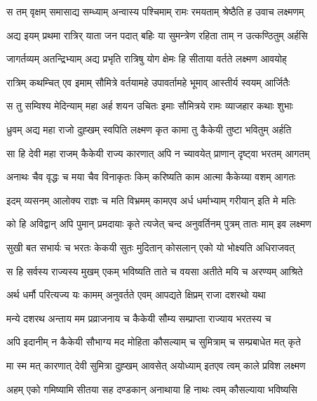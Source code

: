 
\twolineshloka
{स तम् वृक्षम् समासाद्य सम्ध्याम् अन्वास्य पश्चिमाम्}
{रामः रमयताम् श्रेष्ठैति ह उवाच लक्ष्मणम्} %

\twolineshloka
{अद्य इयम् प्रथमा रात्रिर् याता जन पदात् बहिः}
{या सुमन्त्रेण रहिता ताम् न उत्कण्ठितुम् अर्हसि} %

\twolineshloka
{जागर्तव्यम् अतन्द्रिभ्याम् अद्य प्रभृति रात्रिषु}
{योग क्षेमः हि सीताया वर्तते लक्ष्मण आवयोह्} %

\twolineshloka
{रात्रिम् कथम्चित् एव इमाम् सौमित्रे वर्तयामहे}
{उपावर्तामहे भूमाव् आस्तीर्य स्वयम् आर्जितैः} %

\twolineshloka
{स तु सम्विश्य मेदिन्याम् महा अर्ह शयन उचितः}
{इमाः सौमित्रये रामः व्याजहार कथाः शुभाः} %

\twolineshloka
{ध्रुवम् अद्य महा राजो दुह्खम् स्वपिति लक्ष्मण}
{कृत कामा तु कैकेयी तुष्टा भवितुम् अर्हति} %

\twolineshloka
{सा हि देवी महा राजम् कैकेयी राज्य कारणात्}
{अपि न च्यावयेत् प्राणान् दृष्ट्वा भरतम् आगतम्} %

\twolineshloka
{अनाथः चैव वृद्धः च मया चैव विनाकृतः}
{किम् करिष्यति काम आत्मा कैकेय्या वशम् आगतः} %

\twolineshloka
{इदम् व्यसनम् आलोक्य राज्ञः च मति विभ्रमम्}
{कामएव अर्ध धर्माभ्याम् गरीयान् इति मे मतिः} %

\twolineshloka
{को हि अविद्वान् अपि पुमान् प्रमदायाः कृते त्यजेत्}
{चन्द अनुवर्तिनम् पुत्रम् तातः माम् इव लक्ष्मण} %

\twolineshloka
{सुखी बत सभार्यः च भरतः केकयी सुतः}
{मुदितान् कोसलान् एको यो भोक्ष्यति अधिराजवत्} %

\twolineshloka
{स हि सर्वस्य राज्यस्य मुखम् एकम् भविष्यति}
{ताते च वयसा अतीते मयि च अरण्यम् आश्रिते} %

\twolineshloka
{अर्थ धर्मौ परित्यज्य यः कामम् अनुवर्तते}
{एवम् आपद्यते क्षिप्रम् राजा दशरथो यथा} %

\twolineshloka
{मन्ये दशरथ अन्ताय मम प्रव्राजनाय च}
{कैकेयी सौम्य सम्प्राप्ता राज्याय भरतस्य च} %

\twolineshloka
{अपि इदानीम् न कैकेयी सौभाग्य मद मोहिता}
{कौसल्याम् च सुमित्राम् च सम्प्रबाधेत मत् कृते} %

\twolineshloka
{मा स्म मत् कारणात् देवी सुमित्रा दुह्खम् आवसेत्}
{अयोध्याम् इतएव त्वम् काले प्रविश लक्ष्मण} %

\twolineshloka
{अहम् एको गमिष्यामि सीतया सह दण्डकान्}
{अनाथाया हि नाथः त्वम् कौसल्याया भविष्यसि} %

